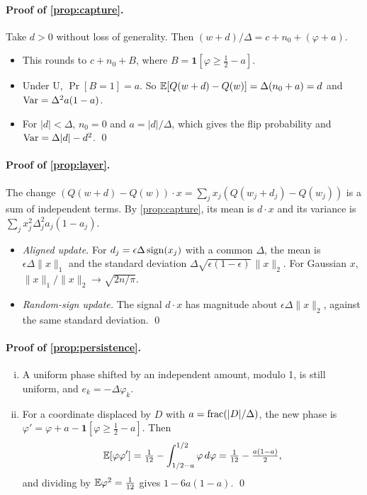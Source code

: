 \paragraph{Proof of \cref{prop:capture}.} Take $d>0$ without loss of generality. Then $(w+d)/\Delta=c+n_0+(\varphi+a)$.
\begin{itemize}[leftmargin=*,itemsep=1pt]
\item This rounds to $c+n_0+B$, where $B=\mathbf 1[\varphi\ge\tfrac12-a]$.
\item Under U, $\Pr[B=1]=a$. So $\mathbb{E}[Q(w+d)-Q(w)]=\Delta(n_0+a)=d$ and $\operatorname{Var}=\Delta^2a(1-a)$.
\item For $|d|<\Delta$, $n_0=0$ and $a=|d|/\Delta$, which gives the flip probability and $\operatorname{Var}=\Delta|d|-d^2$. \qed
\end{itemize}

\paragraph{Proof of \cref{prop:layer}.} The change $(Q(w+d)-Q(w))\cdot x=\sum_jx_j(Q(w_j+d_j)-Q(w_j))$ is a sum of independent terms. By \cref{prop:capture}, its mean is $d\cdot x$ and its variance is $\sum_jx_j^2\Delta_j^2a_j(1-a_j)$.
\begin{itemize}[leftmargin=*,itemsep=1pt]
\item \emph{Aligned update.} For $d_j=\epsilon\Delta\operatorname{sign}(x_j)$ with a common $\Delta$, the mean is $\epsilon\Delta\|x\|_1$ and the standard deviation $\Delta\sqrt{\epsilon(1-\epsilon)}\,\|x\|_2$. For Gaussian $x$, $\|x\|_1/\|x\|_2\to\sqrt{2n/\pi}$.
\item \emph{Random-sign update.} The signal $d\cdot x$ has magnitude about $\epsilon\Delta\|x\|_2$, against the same standard deviation. \qed
\end{itemize}

\paragraph{Proof of \cref{prop:persistence}.}
\begin{enumerate}[(i),leftmargin=*,itemsep=1pt]
\item A uniform phase shifted by an independent amount, modulo 1, is still uniform, and $e_k=-\Delta\varphi_k$.
\item For a coordinate displaced by $D$ with $a=\operatorname{frac}(|D|/\Delta)$, the new phase is $\varphi'=\varphi+a-\mathbf 1[\varphi\ge\tfrac12-a]$. Then
\[
\mathbb{E}[\varphi\varphi']=\tfrac1{12}-\int_{1/2-a}^{1/2}\varphi\,d\varphi=\tfrac1{12}-\tfrac{a(1-a)}2 ,
\]
and dividing by $\mathbb{E}\varphi^2=\tfrac1{12}$ gives $1-6a(1-a)$. \qed
\end{enumerate}

